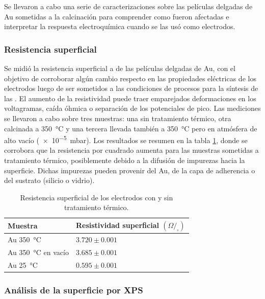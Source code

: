 {{  			Se llevaron a cabo una serie de caracterizaciones sobre las películas delgadas de Au sometidas a la calcinación para comprender como fueron afectadas e interpretar la respuesta electroquímica cuando se las usó como electrodos.
		
		\subsubsection{Resistencia superficial}

			Se midió la resistencia superficial a de las películas delgadas de Au, con el objetivo de corroborar algún cambio respecto en las propiedades eléctricas de los electrodos luego de ser sometidos a las condiciones de procesos para la síntesis de las \pdm. El aumento de la resistividad puede traer emparejados deformaciones en los voltagramas, caída óhmica o separación de los potenciales de pico. Las mediciones se llevaron a cabo sobre tres muestras: una sin tratamiento térmico, otra calcinada a \SI{350}{\celsius} y una tercera llevada también a \SI{350}{\celsius} pero en atmósfera de alto vacío (\SI{e-5}{\milli\bar}). Los resultados se resumen en la tabla \ref{tabla:resistencia}, donde se corrobora que la resistencia por cuadrado aumenta para las muestras sometidas a tratamiento térmico, posiblemente debido a la difusión de impurezas hacia la superficie. Dichas impurezas pueden provenir del Au, de la capa de adherencia o del sustrato (silicio o vidrio).

				\begin{table}[ht!]
			  		  \caption[Resistencia superficial de los electrodos]{Resistencia superficial de los electrodos con y sin tratamiento térmico.} 
			  		  \begin{tabular}{>{\raggedright\arraybackslash}m{4.2cm}>{\raggedright\arraybackslash}m{7.075cm}} 
			  		  \toprule
					  Muestra & Resistividad superficial $(\Omega/_{\square})$  \\ \midrule
			      	  Au \SI{350}{\celsius} 		  	& $3.720 \pm 0.001$		 \\	  
			      	  Au \SI{350}{\celsius} en vacío	& $3.685 \pm 0.001$		 \\	  
			      	  Au \SI{25}{\celsius}    	  		& $0.595 \pm 0.001$		 \\ 
			      	  \bottomrule
			    	  \end{tabular}
			    	  \label{tabla:resistencia}
			   		  \end{table}	
	
		\subsubsection{Análisis de la superficie por XPS}

}}
